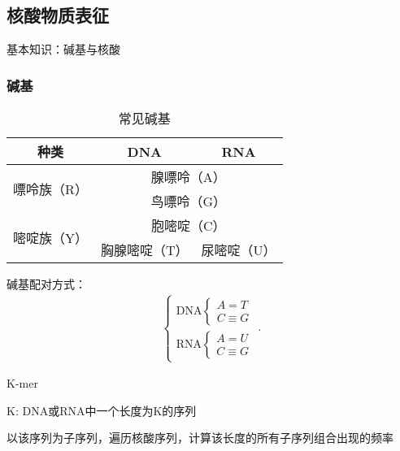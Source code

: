 \subsection{核酸物质表征}%
\label{sub:核酸物质表征}
\begin{notation}
    基本知识：碱基与核酸
\end{notation}
\subsubsection{碱基}%
\label{subsub:-碱基}
\begin{table}[htpb]
    \centering
    \caption{常见碱基}
    \label{tab:常见碱基}
    \begin{tabular}{ccc}
    \toprule
    种类 & DNA & RNA \\
    \midrule
    \multirow{2}{*}{嘌呤族（R）} & \multicolumn{2}{c}{腺嘌呤（A）} \\
                                 & \multicolumn{2}{c}{鸟嘌呤（G）} \\
                                 \midrule
    \multirow{2}{*}{嘧啶族（Y）} & \multicolumn{2}{c}{胞嘧啶（C）} \\
                                 & 胸腺嘧啶（T）& 尿嘧啶（U）\\
    \bottomrule
    \end{tabular}
\end{table}
\begin{notation}
    碱基配对方式：
    \begin{align*}
        \begin{cases}
            \text{DNA}
            \begin{cases}
                A= T \\
                C\equiv G
            \end{cases}\\
            \text{RNA}
            \begin{cases}
                A= U \\
                C\equiv G
            \end{cases}
        \end{cases}
    .\end{align*}
\end{notation}
\begin{notation}
    K-mer

    K: DNA或RNA中一个长度为K的序列

    以该序列为子序列，遍历核酸序列，计算该长度的所有子序列组合出现的频率
\end{notation}

